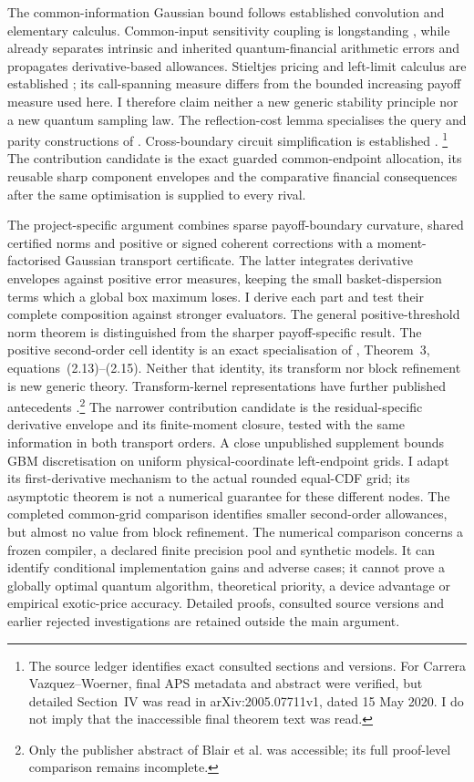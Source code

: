 \documentclass[11pt]{article}
\begin{document}
The common-information Gaussian bound follows established convolution and
elementary calculus. Common-input sensitivity coupling is longstanding
\citep{glassermanyao1992}, while \citet{chakrabarti} already separates
intrinsic and inherited quantum-financial arithmetic errors and propagates
derivative-based allowances. Stieltjes pricing and left-limit calculus are
established \citep{marinelli2024}; its call-spanning measure differs from
the bounded increasing payoff measure used here. I therefore claim neither
a new generic stability principle nor a new quantum sampling law.
The reflection-cost lemma specialises the query and parity constructions
of \citet{suzuki2020,rallfuller2023}. Cross-boundary circuit simplification
is established \citep{stamatopoulos2020,carreravazquez2021}.
\footnote{The source ledger identifies exact consulted sections and versions.
For Carrera Vazquez--Woerner, final APS metadata and abstract were verified,
but detailed Section~IV was read in arXiv:2005.07711v1, dated 15 May 2020.
I do not imply that the inaccessible final theorem text was read.}
The contribution candidate is the exact guarded common-endpoint allocation,
its reusable sharp component envelopes and the comparative financial
consequences after the same optimisation is supplied to every rival.

The project-specific argument combines sparse payoff-boundary curvature,
shared certified norms and positive or signed coherent corrections with a
moment-factorised Gaussian transport certificate. The latter integrates
derivative envelopes against positive error measures, keeping the small
basket-dispersion terms which a global box maximum loses. I derive each part and test
their complete composition against stronger evaluators. The general
positive-threshold norm theorem is distinguished from the sharper
payoff-specific result. The positive second-order cell identity is an exact specialisation of
\citet{cerone2002}, Theorem~3, equations~(2.13)--(2.15). Neither that
identity, its transform nor block refinement is new generic theory.
Transform-kernel representations have further published antecedents
\citep{blair2016}.\footnote{Only the publisher abstract of Blair et al. was accessible; its full proof-level comparison remains incomplete.}
The narrower contribution candidate is the residual-specific derivative
envelope and its finite-moment closure, tested with the same information
in both transport orders. A close unpublished supplement
\citep{herman2026} bounds GBM discretisation on uniform physical-coordinate
left-endpoint grids. I adapt its first-derivative mechanism to the actual
rounded equal-CDF grid; its asymptotic theorem is not a numerical guarantee
for these different nodes. The completed common-grid comparison identifies
smaller second-order allowances, but almost no value from block refinement.
The numerical comparison concerns a frozen compiler,
a declared finite precision pool and synthetic models. It can
identify conditional implementation gains and adverse cases; it cannot
prove a globally optimal quantum algorithm, theoretical priority, a device
advantage or empirical exotic-price accuracy. Detailed proofs, consulted
source versions and earlier rejected investigations are retained outside
the main argument.
\end{document}
